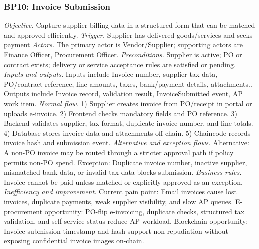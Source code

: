 \documentclass[conference]{IEEEtran}
\begin{document}
\subsubsection{BP10: Invoice Submission}
\textit{Objective.} Capture supplier billing data in a structured form that can be matched and approved efficiently.
\textit{Trigger.} Supplier has delivered goods/services and seeks payment
\textit{Actors.} The primary actor is Vendor/Supplier; supporting actors are Finance Officer, Procurement Officer.
\textit{Preconditions.} Supplier is active; PO or contract exists; delivery or service acceptance rules are satisfied or pending.
\textit{Inputs and outputs.} Inputs include Invoice number, supplier tax data, PO/contract reference, line amounts, taxes, bank/payment details, attachments.. Outputs include Invoice record, validation result, InvoiceSubmitted event, AP work item.
\textit{Normal flow.} 1) Supplier creates invoice from PO/receipt in portal or uploads e-invoice. 2) Frontend checks mandatory fields and PO reference. 3) Backend validates supplier, tax format, duplicate invoice number, and line totals. 4) Database stores invoice data and attachments off-chain. 5) Chaincode records invoice hash and submission event.
\textit{Alternative and exception flows.} Alternative: A non-PO invoice may be routed through a stricter approval path if policy permits non-PO spend. Exception: Duplicate invoice number, inactive supplier, mismatched bank data, or invalid tax data blocks submission.
\textit{Business rules.} Invoice cannot be paid unless matched or explicitly approved as an exception.
\textit{Inefficiency and improvement.} Current pain point: Email invoices cause lost invoices, duplicate payments, weak supplier visibility, and slow AP queues. E-procurement opportunity: PO-flip e-invoicing, duplicate checks, structured tax validation, and self-service status reduce AP workload. Blockchain opportunity: Invoice submission timestamp and hash support non-repudiation without exposing confidential invoice images on-chain.
\end{document}

